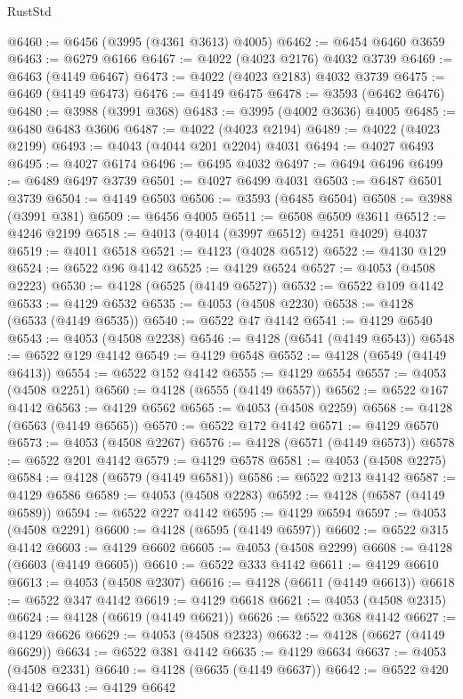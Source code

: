 \begin{lexlean}{RustStd}
\begin{coremodule}
@6460 := @6456 (@3995 (@4361 @3613) @4005)
@6462 := @6454 @6460 @3659
@6463 := @6279 @6166
@6467 := @4022 (@4023 @2176) @4032 @3739
@6469 := @6463 (@4149 @6467)
@6473 := @4022 (@4023 @2183) @4032 @3739
@6475 := @6469 (@4149 @6473)
@6476 := @4149 @6475
@6478 := @3593 (@6462 @6476)
@6480 := @3988 (@3991 @368)
@6483 := @3995 (@4002 @3636) @4005
@6485 := @6480 @6483 @3606
@6487 := @4022 (@4023 @2194)
@6489 := @4022 (@4023 @2199)
@6493 := @4043 (@4044 @201 @2204) @4031
@6494 := @4027 @6493
@6495 := @4027 @6174
@6496 := @6495 @4032
@6497 := @6494 @6496
@6499 := @6489 @6497 @3739
@6501 := @4027 @6499 @4031
@6503 := @6487 @6501 @3739
@6504 := @4149 @6503
@6506 := @3593 (@6485 @6504)
@6508 := @3988 (@3991 @381)
@6509 := @6456 @4005
@6511 := @6508 @6509 @3611
@6512 := @4246 @2199
@6518 := @4013 (@4014 (@3997 @6512) @4251 @4029) @4037
@6519 := @4011 @6518
@6521 := @4123 (@4028 @6512)
@6522 := @4130 @129
@6524 := @6522 @96 @4142
@6525 := @4129 @6524
@6527 := @4053 (@4508 @2223)
@6530 := @4128 (@6525 (@4149 @6527))
@6532 := @6522 @109 @4142
@6533 := @4129 @6532
@6535 := @4053 (@4508 @2230)
@6538 := @4128 (@6533 (@4149 @6535))
@6540 := @6522 @47 @4142
@6541 := @4129 @6540
@6543 := @4053 (@4508 @2238)
@6546 := @4128 (@6541 (@4149 @6543))
@6548 := @6522 @129 @4142
@6549 := @4129 @6548
@6552 := @4128 (@6549 (@4149 @6413))
@6554 := @6522 @152 @4142
@6555 := @4129 @6554
@6557 := @4053 (@4508 @2251)
@6560 := @4128 (@6555 (@4149 @6557))
@6562 := @6522 @167 @4142
@6563 := @4129 @6562
@6565 := @4053 (@4508 @2259)
@6568 := @4128 (@6563 (@4149 @6565))
@6570 := @6522 @172 @4142
@6571 := @4129 @6570
@6573 := @4053 (@4508 @2267)
@6576 := @4128 (@6571 (@4149 @6573))
@6578 := @6522 @201 @4142
@6579 := @4129 @6578
@6581 := @4053 (@4508 @2275)
@6584 := @4128 (@6579 (@4149 @6581))
@6586 := @6522 @213 @4142
@6587 := @4129 @6586
@6589 := @4053 (@4508 @2283)
@6592 := @4128 (@6587 (@4149 @6589))
@6594 := @6522 @227 @4142
@6595 := @4129 @6594
@6597 := @4053 (@4508 @2291)
@6600 := @4128 (@6595 (@4149 @6597))
@6602 := @6522 @315 @4142
@6603 := @4129 @6602
@6605 := @4053 (@4508 @2299)
@6608 := @4128 (@6603 (@4149 @6605))
@6610 := @6522 @333 @4142
@6611 := @4129 @6610
@6613 := @4053 (@4508 @2307)
@6616 := @4128 (@6611 (@4149 @6613))
@6618 := @6522 @347 @4142
@6619 := @4129 @6618
@6621 := @4053 (@4508 @2315)
@6624 := @4128 (@6619 (@4149 @6621))
@6626 := @6522 @368 @4142
@6627 := @4129 @6626
@6629 := @4053 (@4508 @2323)
@6632 := @4128 (@6627 (@4149 @6629))
@6634 := @6522 @381 @4142
@6635 := @4129 @6634
@6637 := @4053 (@4508 @2331)
@6640 := @4128 (@6635 (@4149 @6637))
@6642 := @6522 @420 @4142
@6643 := @4129 @6642

\end{coremodule}
\end{lexlean}
